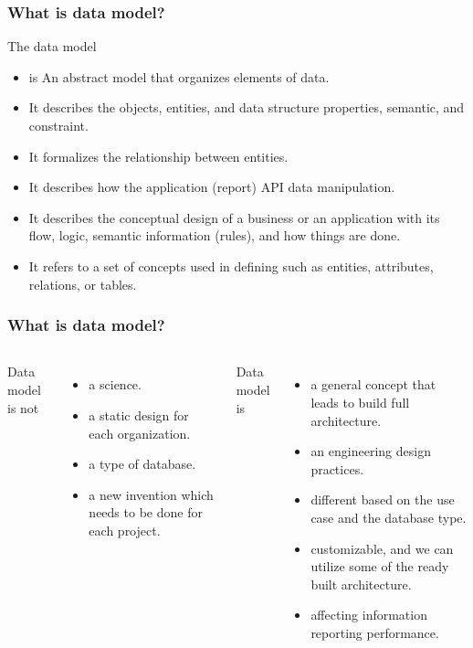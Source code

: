 
\begin{frame}
    \frametitle{What is data model?}
	The data model
    \begin{itemize}[<+->]
        \item is An abstract model that organizes elements of data.
        \item It describes the objects, entities, and data structure properties, semantic, and constraint.
        \item It formalizes the relationship between entities.
        \item It describes how the application (report) API data manipulation.
        \item It describes the conceptual design of a business or an application with its flow, logic, semantic information (rules), and how things are done.
        \item It refers to a set of concepts used in defining such as entities, attributes, relations, or tables.
    \end{itemize}
\end{frame}

\begin{frame}
    \frametitle{What is data model?}

    \begin{columns}

        Data model is not
        \begin{itemize}[<+->]
            \item a science.
            \item a static design for each organization.
            \item a type of database.
            \item a new invention which needs to be done for each project.
        \end{itemize}


        Data model is
        \begin{itemize}[<+->]
            \item a general concept that leads to build full architecture.
            \item an engineering design practices.
            \item different based on the use case and the database type.
            \item customizable, and we can utilize some of the ready built architecture.
            \item affecting information reporting performance.
        \end{itemize}

    \end{columns}

\end{frame}

